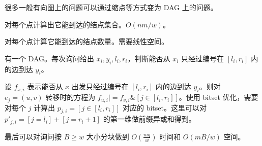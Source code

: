 很多一般有向图上的问题可以通过缩点等方式变为 DAG 上的问题。

\begin{example}
    对每个点计算出它能到达的结点集合。$O(nm/w)$。
\end{example}
\begin{exercise}
    对每个点计算它能到达的结点数量。需要线性空间。
\end{exercise}

\begin{example}
    有一个 DAG。每次询问给出 $x_i,y_i,l_i,r_i$，判断能否从 $x_i$ 只经过编号在 $[l_i,r_i]$ 内的边到达 $y_i$。
\end{example}
\begin{solution}
    设 $f_{x,i}$ 表示能否从 $x$ 出发只经过编号在 $[l_i,r_i]$ 内的边到达 $y_i$。则对 $e_j=(u,v)$ 转移时的方程为 $f_{u,i}|=f_{v,i}\& [j\in [l_i,r_i]]$。使用 bitset 优化，需要对每个 $j$ 计算出 $p_{j,i}=[j\in [l_i,r_i]]$ 对应的 bitset。这里可以对 $p'_{j,i}=[j=l_i]+[j=r_i+1]$ 的第一维做前缀异或和得到。

    最后可以对询问按 $B\ge w$ 大小分块做到 $O(\frac{mq}{w})$ 时间和 $O(mB/w)$ 空间。
\end{solution}


